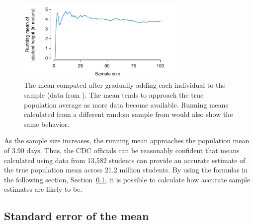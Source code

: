 \begin{spacing}{1.5}
\begin{figure}[h]
   \centering
   \includegraphics[width=0.72\textwidth]{ch_inference_foundations_oi_biostat/figures/yrbssActiveRunningMean/yrbssActiveRunningMean}
   \caption{The mean computed after gradually adding each individual to the sample (data from ). The mean tends to approach the true population average as more data become available. Running means calculated from a different random sample from  would also show the same behavior.}
   \label{yrbssActiveRunningMean}
\end{figure}

As the sample size increases, the running mean approaches the population mean of 3.90 days. Thus, the CDC officials can be reasonably confident that means calculated using data from 13,582 students can provide an accurate estimate of the true population mean across 21.2 million students. By using the formulas in the following section, Section~\ref{seOfTheMean}, it is possible to calculate how accurate sample estimates are likely to be.

\subsection{Standard error of the mean}
\label{seOfTheMean}


\end{spacing}
